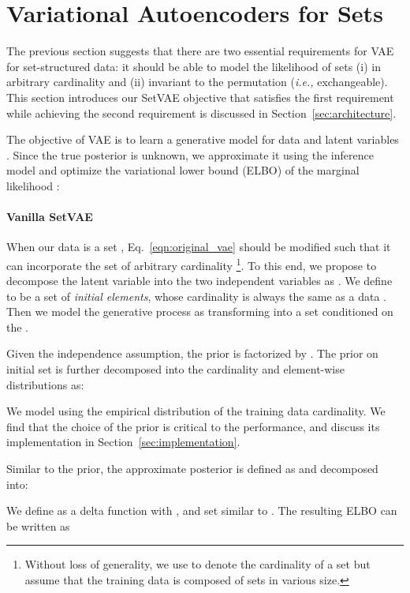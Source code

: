 \documentclass[final]{arxiv/cvpr}
\newcommand{\cutparagraphup}{\vspace*{-0.1in}}
\begin{document}
 \section{Variational Autoencoders for Sets}
\label{sec:method}
The previous section suggests that there are two essential requirements for VAE for set-structured data: it should be able to model the likelihood of sets (i) in arbitrary cardinality and (ii) invariant to the permutation (\emph{i.e.,} exchangeable). 
This section introduces our SetVAE objective that satisfies the first requirement while achieving the second requirement is discussed in Section~\ref{sec:architecture}.

The objective of VAE \cite{kingma2014autoencoding} is to learn a generative model  for data  and latent variables . 
Since the true posterior is unknown, we approximate it using the inference model  and optimize the variational lower bound (ELBO) of the marginal likelihood :


\cutparagraphup
\paragraph{Vanilla SetVAE}
When our data is a set , Eq.~\eqref{eqn:original_vae} should be modified such that it can incorporate the set of arbitrary cardinality \footnote{Without loss of generality, we use  to denote the cardinality of a set but assume that the training data is composed of sets in various size.}.
To this end, we propose to decompose the latent variable  into the two independent variables as .
We define  to be a set of \textit{initial elements}, whose cardinality is always the same as a data . 
Then we model the generative process as transforming  into a set  conditioned on the .

Given the independence assumption, the prior is factorized by .
The prior on initial set  is further decomposed into the cardinality and element-wise distributions as:

We model  using the empirical distribution of the training data cardinality.
We find that the choice of the prior  is critical to the performance, and discuss its implementation in Section~\ref{sec:implementation}.

Similar to the prior, the approximate posterior is defined as  and decomposed into:

We define  as a delta function with , and set  similar to \cite{yang2019pointflow, kosiorek2020conditional, locatello2020objectcentric}.
The resulting ELBO can be written as
\end{document}
